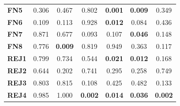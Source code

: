 \begin{table}
\begin{tabular}{lccc|ccc}
        \textbf{FN5}  & 0.306                                   & 0.467                                             & 0.802                                  & \cellcolor[HTML]{EFEFEF}\textbf{0.001}   & \cellcolor[HTML]{EFEFEF}\textbf{0.009} & 0.349                                  \\
        \textbf{FN6}  & 0.109                                   & 0.113                                             & 0.928                                  & \cellcolor[HTML]{EFEFEF}\textbf{0.012}   & 0.084                                  & 0.436                                  \\
        \textbf{FN7}  & 0.871                                   & 0.677                                             & 0.093                                  & 0.107                                    & \cellcolor[HTML]{EFEFEF}\textbf{0.046} & 0.148                                  \\
        \textbf{FN8}  & 0.776                                   & \cellcolor[HTML]{EFEFEF}\textbf{0.009}            & 0.819                                  & 0.949                                    & 0.363                                  & 0.117                                  \\
        \textbf{REJ1} & 0.799                                   & 0.734                                             & 0.544                                  & \cellcolor[HTML]{EFEFEF}\textbf{0.021}   & \cellcolor[HTML]{EFEFEF}\textbf{0.012} & 0.168                                  \\
        \textbf{REJ2} & 0.644                                   & 0.202                                             & 0.741                                  & 0.295                                    & 0.258                                  & 0.749                                  \\
        \textbf{REJ3} & 0.803                                   & 0.815                                             & 0.108                                  & 0.425                                    & 0.482                                  & 0.133                                  \\
        \textbf{REJ4} & 0.985                                   & 1.000                                             & \cellcolor[HTML]{EFEFEF}\textbf{0.002} & \cellcolor[HTML]{EFEFEF}\textbf{0.014}   & \cellcolor[HTML]{EFEFEF}\textbf{0.036} & \cellcolor[HTML]{EFEFEF}\textbf{0.002} \\

\end{tabular}
\end{table}

